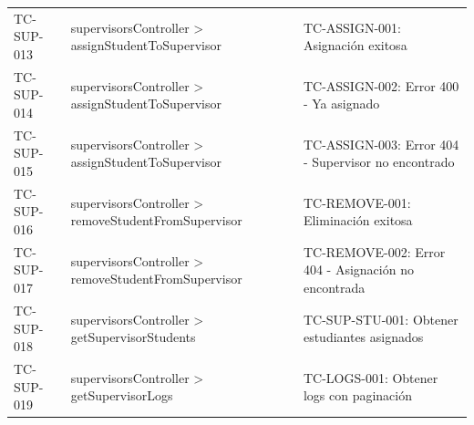 \begin{longtable}{l L{0.30\textwidth} L{0.40\textwidth}}
TC-SUP-013 & supervisorsController > assignStudentToSupervisor & TC-ASSIGN-001: Asignación exitosa \\
TC-SUP-014 & supervisorsController > assignStudentToSupervisor & TC-ASSIGN-002: Error 400 - Ya asignado \\
TC-SUP-015 & supervisorsController > assignStudentToSupervisor & TC-ASSIGN-003: Error 404 - Supervisor no encontrado \\
TC-SUP-016 & supervisorsController > removeStudentFromSupervisor & TC-REMOVE-001: Eliminación exitosa \\
TC-SUP-017 & supervisorsController > removeStudentFromSupervisor & TC-REMOVE-002: Error 404 - Asignación no encontrada \\
TC-SUP-018 & supervisorsController > getSupervisorStudents & TC-SUP-STU-001: Obtener estudiantes asignados \\
TC-SUP-019 & supervisorsController > getSupervisorLogs & TC-LOGS-001: Obtener logs con paginación \\
\end{longtable}

